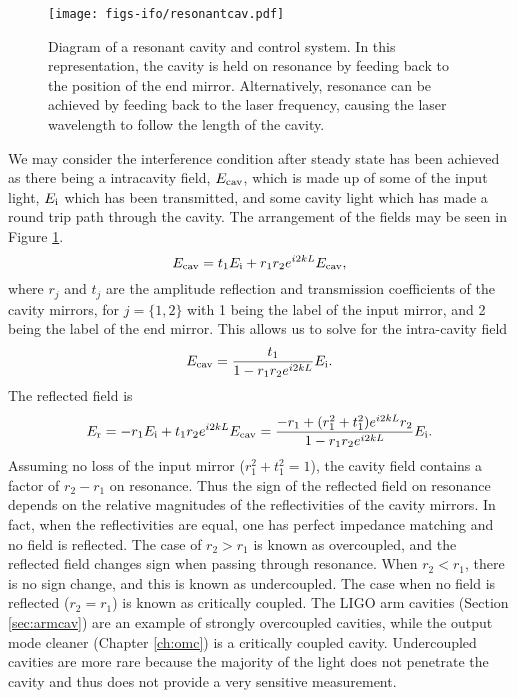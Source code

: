 \begin{figure}
  \begin{center}
  \leavevmode
  \texttt{[image: figs-ifo/resonantcav.pdf]}
  \end{center}
  \caption[Diagram of a resonant cavity and control system]{Diagram of a resonant cavity and control system. In this representation, the cavity is held on resonance by feeding back to the position of the end mirror. Alternatively, resonance can be achieved by feeding back to the laser frequency, causing the laser wavelength to follow the length of the cavity.}
  \label{fig:resonantcav}
\end{figure}

We may consider the interference condition after steady state has been achieved as there being a intracavity field, $E_{\rm{cav}}$, which is made up of some of the input light, $E_{\rm i}$ which has been transmitted, and some cavity light which has made a round trip path through the cavity. %
The arrangement of the fields may be seen in Figure \ref{fig:resonantcav}.
\begin{equation}
E_{\rm{cav}}=t_1 E_{\rm i} + r_1 r_2 e^{i 2 k L} E_{\rm{cav}},
\end{equation}
where $r_j$ and $t_j$ are the amplitude reflection and transmission coefficients of the cavity mirrors, for $j=\{1,2\}$ with 1 being the label of the input mirror, and 2 being the label of the end mirror. %
This allows us to solve for the intra-cavity field
\begin{equation}
E_{\rm{cav}}=\frac{t_1}{1 - r_1 r_2 e^{i 2 k L}} E_{\rm i}.
\end{equation}
The reflected field is
\begin{equation}
E_{\rm{r}}=-r_1 E_{\rm i} + t_1r_2 e^{i 2 k L} E_{\rm{cav}}=\frac{-r_1+(r_1^2+t_1^2)e^{i2kL}r_2}{1-r_1r_2e^{i2kL}}E_{\rm i}.
\end{equation}
Assuming no loss of the input mirror ($r_1^2+t_1^2=1$), the cavity field contains a factor of $r_2-r_1$ on resonance. %
Thus the sign of the reflected field on resonance depends on the relative magnitudes of the reflectivities of the cavity mirrors. %
In fact, when the reflectivities are equal, one has perfect impedance matching and no field is reflected. %
The case of $r_2>r_1$ is known as overcoupled, and the reflected field changes sign when passing through resonance. %
When $r_2<r_1$, there is no sign change, and this is known as undercoupled. %
The case when no field is reflected ($r_2=r_1$) is known as critically coupled. %
The LIGO arm cavities (Section \ref{sec:armcav}) are an example of strongly overcoupled cavities, while the output mode cleaner (Chapter \ref{ch:omc}) is a critically coupled cavity. %
Undercoupled cavities are more rare because the majority of the light does not penetrate the cavity and thus does not provide a very sensitive measurement.

